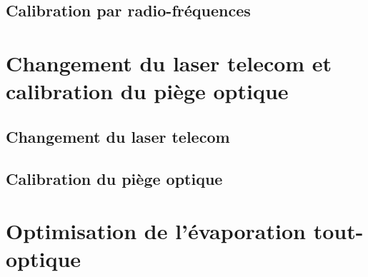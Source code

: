 \subsection{Calibration par radio-fréquences}

\section{Changement du laser telecom et calibration du piège optique}
\subsection{Changement du laser telecom}
\subsection{Calibration du piège optique}

\section{Optimisation de l'évaporation tout-optique}
\label{sc:evap_optique}

